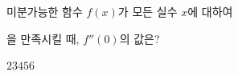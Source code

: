 \hspace*{2mm}\begin{minipage}[t]{\dimexpr\linewidth-2mm\relax}\vspace{0pt}
미분가능한 함수 $f(x)$가 모든 실수 $x$에 대하여 \par\smallskip{}\par\smallskip\noindent 을 만족시킬 때, $f''(0)$의 값은?
\begin{choices32}{$2$}{$3$}{$4$}{$5$}{$6$}\end{choices32}\end{minipage}
